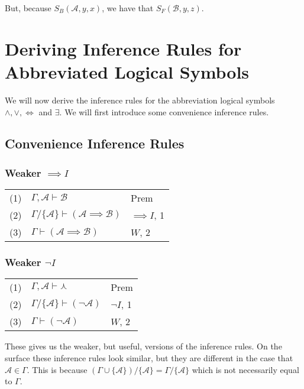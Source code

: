 \documentclass[12pt]{article}
\theoremstyle{break}
\theoremstyle{break}
\theoremstyle{break}
\theoremstyle{break}
\theoremstyle{break}
\newtheorem{informal definition}[definition]{Informal Definition}
\newcommand{\mc}[1]{\mathcal{#1}}
\begin{document}
But, because $S_B(\mc{A}, y, x)$, we have that $S_F(\mc{B}, y, z)$.

\newpage

\section{Deriving Inference Rules for Abbreviated Logical Symbols}

We will now derive the inference rules for the abbreviation logical symbols $\land, \lor, \iff$ and $\exists$.
We will first introduce some convenience inference rules.

\subsection{Convenience Inference Rules}

\subsubsection*{Weaker $\implies I$}

\begin{center}
\begin{tabular}{ p{1cm} p{6cm} p{2cm} }
(1) & $\Gamma, \mc{A} \vdash \mc{B}$ & Prem\\
(2) & $\Gamma/\{\mc{A}\} \vdash (\mc{A} \implies \mc{B})$ & $\implies I$, 1\\
(3) & $\Gamma \vdash (\mc{A} \implies \mc{B})$ & $W$, 2
\end{tabular}
\end{center}

\subsubsection*{Weaker $\lnot I$}

\begin{center}
\begin{tabular}{ p{1cm} p{6cm} p{2cm} }
(1) & $\Gamma, \mc{A} \vdash \curlywedge$ & Prem\\
(2) & $\Gamma/\{\mc{A}\} \vdash (\lnot \mc{A})$ & $\lnot I$, 1\\
(3) & $\Gamma \vdash (\lnot \mc{A})$ & $W$, 2
\end{tabular}
\end{center}

These gives us the weaker, but useful, versions of the inference rules.
On the surface these inference rules look similar, but they are different in the case that $\mc{A} \in \Gamma$.
This is because $(\Gamma \cup \{\mc{A}\})/\{\mc{A}\} = \Gamma / \{\mc{A}\}$ which is not necessarily equal to $\Gamma$.
\end{document}
